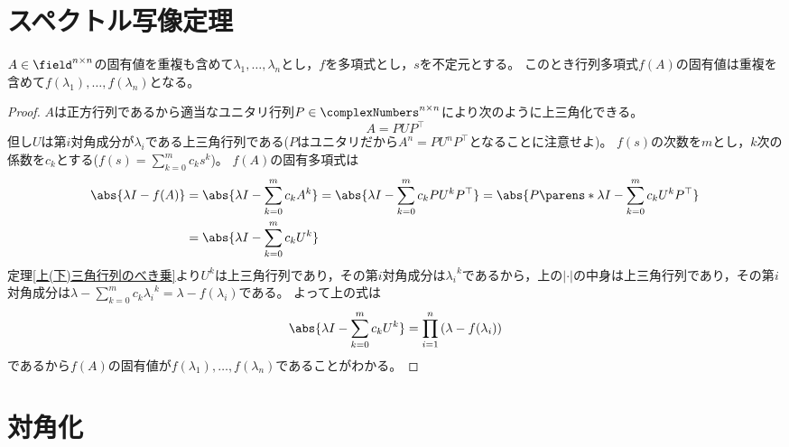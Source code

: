     \section{スペクトル写像定理}
        \begin{shadebox}
            $A\in\field^{n\times n}$の固有値を重複も含めて$\lambda_1,\dotsc,\lambda_n$とし，$f$を多項式とし，$s$を不定元とする。
            このとき行列多項式$f(A)$の固有値は重複を含めて$f(\lambda_1),\dotsc,f(\lambda_n)$となる。
        \end{shadebox}
        \begin{proof}
            $A$は正方行列であるから適当なユニタリ行列$P\in\complexNumbers^{n\times n}$により次のように上三角化できる。
            \[A = PUP^\top\]
            但し$U$は第$i$対角成分が$\lambda_i$である上三角行列である($P$はユニタリだから$A^n = PU^nP^\top$となることに注意せよ)。
            $f(s)$の次数を$m$とし，$k$次の係数を$c_k$とする($f(s) = \sum_{k=0}^{m}c_{k}s^k$)。
            $f(A)$の固有多項式は
            \begin{align*}
                \abs{\lambda I - f(A)} &= \abs{\lambda I - \sum_{k=0}^{m}c_{k}A^k} = \abs{\lambda I - \sum_{k=0}^{m}c_{k}PU^kP^\top} = \abs{P\parens*{\lambda I - \sum_{k=0}^{m}c_{k}U^k}P^\top} \\
                &= \abs{\lambda I - \sum_{k=0}^{m}c_{k}U^k}
            \end{align*}
            定理\ref{上(下)三角行列のべき乗}より$U^k$は上三角行列であり，その第$i$対角成分は${\lambda_i}^k$であるから，上の$|\cdot|$の中身は上三角行列であり，その第$i$対角成分は$\lambda - \sum_{k=0}^{m}c_{k}{\lambda_i}^k = \lambda - f(\lambda_i)$である。
            よって上の式は
            \[\abs{\lambda I - \sum_{k=0}^{m}c_{k}U^k} = \prod_{i=1}^{n}{(\lambda - f(\lambda_i))}\]
            であるから$f(A)$の固有値が$f(\lambda_1),\dotsc,f(\lambda_n)$であることがわかる。
        \end{proof}
    \section{対角化}
